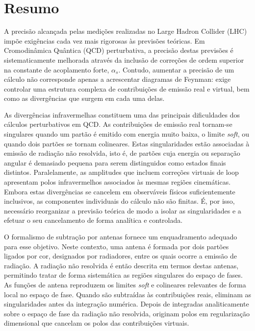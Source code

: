 \chapter*{Resumo}

A precisão alcançada pelas medições realizadas no Large Hadron Collider (LHC) impõe
exigências cada vez mais rigorosas às previsões teóricas. Em Cromodinâmica Quântica
(QCD) perturbativa, a precisão destas previsões é sistematicamente melhorada através
da inclusão de correções de ordem superior na constante de acoplamento forte,
\(\alpha_s\). Contudo, aumentar a precisão de um cálculo não corresponde apenas a
acrescentar diagramas de Feynman: exige controlar uma estrutura complexa de
contribuições de emissão real e virtual, bem como as divergências que surgem em cada
uma delas.

As divergências infravermelhas constituem uma das principais dificuldades dos 
cálculos perturbativos em QCD. As contribuições de emissão real tornam-se singulares 
quando um partão é emitido com energia muito baixa, o limite \textit{soft}, ou quando dois
partões se tornam colineares. Estas singularidades estão associadas à emissão de
radiação não resolvida, isto é, de partões cuja energia ou separação angular é
demasiado pequena para serem distinguidos como estados finais distintos. Paralelamente,
as amplitudes que incluem correções virtuais de loop apresentam polos
infravermelhos associados às mesmas regiões cinemáticas. Embora estas divergências se 
cancelem em observáveis físicos suficientemente inclusivos, as componentes 
individuais do cálculo não são finitas. É, por isso, necessário reorganizar a 
previsão teórica de modo a isolar as singularidades e a efetuar o seu cancelamento 
de forma analítica e controlada.

O formalismo de subtração por antenas fornece um enquadramento adequado para esse
objetivo. Neste contexto, uma antena é formada por dois partões ligados por cor,
designados por radiadores, entre os quais ocorre a emissão de radiação. A radiação
não resolvida é então descrita em termos destas antenas, permitindo tratar de forma
sistemática as regiões singulares do espaço de fases. As funções de antena reproduzem os
limites \textit{soft} e colineares relevantes de forma local no espaço de fase. Quando são 
subtraídas às contribuições reais, eliminam as singularidades antes da integração 
numérica. Depois de integradas analiticamente sobre o espaço de fase da radiação 
não resolvida, originam polos em regularização dimensional que cancelam os polos 
das contribuições virtuais.

